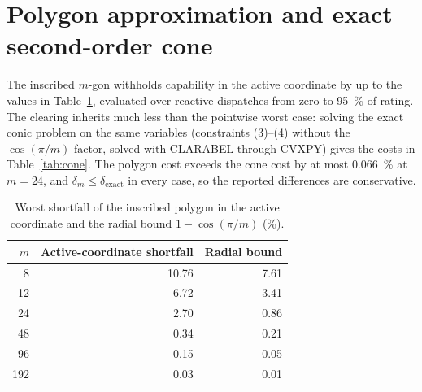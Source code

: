 \documentclass[11pt,a4paper]{article}
\begin{document}
\section{Polygon approximation and exact second-order cone}
\label{s:polygon}

The inscribed $m$-gon withholds capability in the active coordinate by up to
the values in Table~\ref{tab:polygon}, evaluated over reactive dispatches from
zero to \SI{95}{\percent} of rating. The clearing inherits much less than the
pointwise worst case: solving the exact conic problem on the same variables
(constraints (3)--(4) without the $\cos(\pi/m)$ factor, solved with
CLARABEL through CVXPY) gives the costs in Table~\ref{tab:cone}. The polygon
cost exceeds the cone cost by at most \SI{0.066}{\percent} at $m = 24$, and
$\delta_m \le \delta_{\mathrm{exact}}$ in every case, so the reported
differences are conservative.

\begin{table}[h]
  \caption{Worst shortfall of the inscribed polygon in the active coordinate
  and the radial bound $1 - \cos(\pi/m)$ (\%).}
  \label{tab:polygon}
  \centering
  \begin{tabular}{r rr}
    \toprule
    $m$ & Active-coordinate shortfall & Radial bound \\
    \midrule
    8 & 10.76 & 7.61 \\
    12 & 6.72 & 3.41 \\
    24 & 2.70 & 0.86 \\
    48 & 0.34 & 0.21 \\
    96 & 0.15 & 0.05 \\
    192 & 0.03 & 0.01 \\
    \bottomrule
  \end{tabular}
\end{table}
\end{document}
